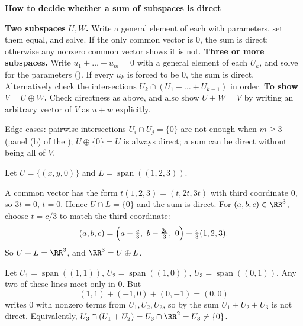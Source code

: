 \documentclass[10pt]{scrartcl}
\DeclareMathOperator{\spn}{span}
\newenvironment{methodbox}[1]{\begin{mdframed}[style=methodstyle]\textbf{\color{NavyBlue}#1}\par\vspace{2pt}}{\end{mdframed}}
\begin{document}
\begin{methodbox}{How to decide whether a sum of subspaces is direct}
  \begin{steps}
    \ii \textbf{Two subspaces $U,W$.} Write a general element of each with parameters, set them equal, and solve. If the only common vector is $0$, the sum is direct; otherwise any nonzero common vector shows it is not.
    \ii \textbf{Three or more subspaces.} Write $u_1+\dots+u_m=0$ with a general element of each $U_k$, and solve for the parameters (). If every $u_k$ is forced to be $0$, the sum is direct. Alternatively check the intersections $U_k\cap(U_1+\dots+U_{k-1})$ in order.
    \ii \textbf{To show $V=U\oplus W$.} Check directness as above, and also show $U+W=V$ by writing an arbitrary vector of $V$ as $u+w$ explicitly.
  \end{steps}
  Edge cases: pairwise intersections $U_i\cap U_j=\{0\}$ are not enough when $m\ge3$ (panel (b) of the ); $U\oplus\{0\}=U$ is always direct; a sum can be direct without being all of $V$.
\end{methodbox}

\begin{example*}[A plane and a line in $\RR^3$: $\RR^3=U\oplus L$]
  Let $U=\{(x,y,0)\}$ and $L=\spn((1,2,3))$.
  \begin{steps}
    \ii A common vector has the form $t(1,2,3)=(t,2t,3t)$ with third coordinate $0$, so $3t=0$, $t=0$. Hence $U\cap L=\{0\}$ and the sum is direct.
    \ii For $(a,b,c)\in\RR^3$, choose $t=c/3$ to match the third coordinate:
    \[
      (a,b,c)=\Bigl(a-\tfrac c3,\ b-\tfrac{2c}3,\ 0\Bigr)+\tfrac c3(1,2,3).
    \]
    So $U+L=\RR^3$, and $\RR^3=U\oplus L$.
  \end{steps}
\end{example*}

\begin{example*}
  Let $U_1=\spn((1,1))$, $U_2=\spn((1,0))$, $U_3=\spn((0,1))$. Any two of these lines meet only in $0$. But
  \[
    (1,1)+(-1,0)+(0,-1)=(0,0)
  \]
  writes $0$ with nonzero terms from $U_1,U_2,U_3$, so by  the sum $U_1+U_2+U_3$ is not direct. Equivalently, $U_3\cap(U_1+U_2)=U_3\cap\RR^2=U_3\ne\{0\}$.
\end{example*}
\end{document}
